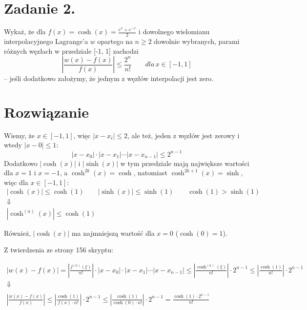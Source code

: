 \documentclass[a4paper]{article}
\renewcommand{\le}{\leqslant} %
\renewcommand{\ge}{\geqslant} %
\begin{document}
   \section*{Zadanie 2.}

      Wykaż, że dla $f(x) = \cosh(x) = \frac{e^{x} + e^{-x}}{2}$
      i dowolnego wielomianu interpolacyjnego Lagrange'a $w$ opartego na $n \ge 2$ dowolnie wybranych,
      parami różnych węzłach w przedziale [-1, 1] zachodzi
      \[
         \left| \frac{w(x) - f(x)}{f(x)} \right| \le \frac{2^{n}}{n!} \quad \quad dla \, x \in [-1, 1]
      \]
      -- jeśli dodatkowo założymy, że jednym z węzłów interpolacji jest zero.


   \section*{\large Rozwiązanie}

      Wiemy, że $x \in [-1, 1]$, więc $\left| x - x_{i} \right| \le 2$,
      ale też, jeden z węzłów jest zerowy i wtedy $\left| x - 0 \right| \le 1$:
      \[
         \left| x - x_{0} \right| \cdot
         \left| x - x_{1} \right| \cdots
         \left| x - x_{n-1} \right| \le 2^{n-1}
      \]
      Dodatkowo $\left| \cosh(x) \right|$ i $\left| \sinh(x) \right|$
      w tym przedziale mają największe wartości dla $x = 1$ i $x = -1$,
      a $\cosh^{2k}(x) = \cosh$, natomiast $\cosh^{2k + 1}(x) = \sinh$, więc dla $x \in [-1, 1]$:
      \begin{gather*}
         \left| \cosh(x) \right| \le \cosh(1) \quad \quad
         \left| \sinh(x) \right| \le \sinh(1) \quad \quad
         \cosh(1) > \sinh(1) \\
         \Downarrow \\
         \left| \cosh^{(n)}(x) \right| \le \cosh(1)
      \end{gather*}

      Również, $\left| \cosh(x) \right|$ ma najmniejszą wartość dla $x = 0$ ($\cosh(0) = 1$).

      Z twierdzenia ze strony 156 skryptu:

      \begin{gather*}
         \left| w(x) - f(x) \right| =
         \left| \frac{f^{(n)}(\xi)}{n!} \right| \cdot
            \left| x - x_{0} \right| \cdot
            \left| x - x_{1} \right| \cdots
            \left| x - x_{n-1} \right| \le
         \left| \frac{\cosh^{(n)}(\xi)}{n!} \right| \cdot 2^{n-1} \le
         \left| \frac{\cosh(1)}{n!} \right| \cdot 2^{n-1} \\
         \Downarrow \\
         \\
         \left| \frac{w(x) - f(x)}{f(x)} \right| \le
         \left| \frac{\cosh(1)}{f(x) \cdot n!} \right| \cdot 2^{n-1} \le
         \left| \frac{\cosh(1)}{\cosh(0) \cdot n!} \right| \cdot 2^{n-1} =
         \frac{\cosh(1) \cdot 2^{n-1}}{n!}
      \end{gather*}
\end{document}
